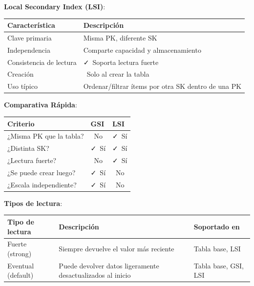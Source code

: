 \documentclass[12pt,a4paper]{report}
\newcommand{\vcheckmark}{\textcolor{successgreen}{\faCheck}}
\newcommand{\crossmark}{\textcolor{dangerred}{\faTimes}}
\begin{document}
\textbf{Local Secondary Index (LSI)}:

\begin{center}
\begin{longtable}{|p{4cm}|p{9cm}|}
\hline
\cellcolor{awsblue!20}\textbf{Característica} & \cellcolor{awsblue!20}\textbf{Descripción} \\
\hline
Clave primaria & Misma PK, diferente SK \\
\hline
Independencia & Comparte capacidad y almacenamiento \\
\hline
Consistencia de lectura & \vcheckmark\ Soporta lectura fuerte \\
\hline
Creación & \crossmark\ Solo al crear la tabla \\
\hline
Uso típico & Ordenar/filtrar ítems por otra SK dentro de una PK \\
\hline
\end{longtable}
\end{center}

\textbf{Comparativa Rápida}:

\begin{center}
\begin{longtable}{|p{3cm}|p{3cm}|p{7cm}|}
\hline
\cellcolor{awsblue!20}\textbf{Criterio} & \cellcolor{awsblue!20}\textbf{GSI} & \cellcolor{awsblue!20}\textbf{LSI} \\
\hline
¿Misma PK que la tabla? & \crossmark\ No & \vcheckmark\ Sí \\
\hline
¿Distinta SK? & \vcheckmark\ Sí & \vcheckmark\ Sí \\
\hline
¿Lectura fuerte? & \crossmark\ No & \vcheckmark\ Sí \\
\hline
¿Se puede crear luego? & \vcheckmark\ Sí & \crossmark\ No \\
\hline
¿Escala independiente? & \vcheckmark\ Sí & \crossmark\ No \\
\hline
\end{longtable}
\end{center}

\textbf{Tipos de lectura}:

\begin{center}
\begin{longtable}{|p{3cm}|p{5cm}|p{5cm}|}
\hline
\cellcolor{awsblue!20}\textbf{Tipo de lectura} & \cellcolor{awsblue!20}\textbf{Descripción} & \cellcolor{awsblue!20}\textbf{Soportado en} \\
\hline
Fuerte (strong) & Siempre devuelve el valor más reciente & Tabla base, LSI \\
\hline
Eventual (default) & Puede devolver datos ligeramente desactualizados al inicio & Tabla base, GSI, LSI \\
\hline
\end{longtable}
\end{center}
\end{document}

